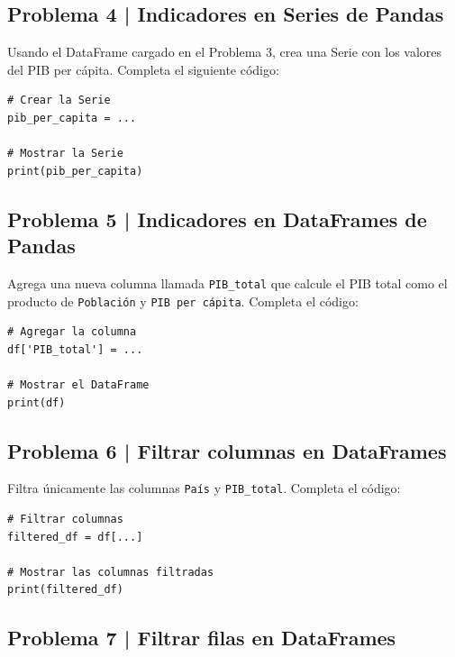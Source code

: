 \documentclass{article}
\begin{document}
\clearpage

\subsection*{Problema 4 | Indicadores en Series de Pandas}

Usando el DataFrame cargado en el Problema 3, crea una Serie con los valores del PIB per cápita. Completa el siguiente código:

\begin{lstlisting}[style=python]
# Crear la Serie
pib_per_capita = ...

# Mostrar la Serie
print(pib_per_capita)
\end{lstlisting}

\clearpage

\subsection*{Problema 5 | Indicadores en DataFrames de Pandas}

Agrega una nueva columna llamada \texttt{PIB\_total} que calcule el PIB total como el producto de \texttt{Población} y \texttt{PIB per cápita}. Completa el código:

\begin{lstlisting}[style=python]
# Agregar la columna
df['PIB_total'] = ...

# Mostrar el DataFrame
print(df)
\end{lstlisting}

\clearpage

\subsection*{Problema 6 | Filtrar columnas en DataFrames}

Filtra únicamente las columnas \texttt{País} y \texttt{PIB\_total}. Completa el código:

\begin{lstlisting}[style=python]
# Filtrar columnas
filtered_df = df[...]

# Mostrar las columnas filtradas
print(filtered_df)
\end{lstlisting}

\clearpage

\subsection*{Problema 7 | Filtrar filas en DataFrames}
\end{document}
